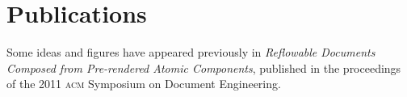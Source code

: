 \cleardoublepage
\chapter*{Publications}
Some ideas and figures have appeared previously in \emph{Reflowable Documents Composed from
Pre-rendered Atomic Components}\cite{Pinkney2011}, published in the proceedings of the 2011
\textsc{acm} Symposium on Document Engineering.